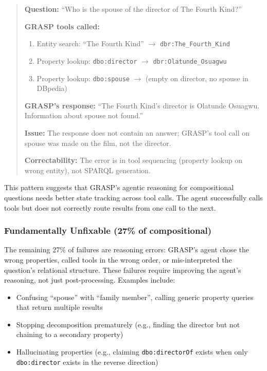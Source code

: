 \begin{quote}
\small
\textbf{Question:} ``Who is the spouse of the director of The Fourth Kind?''

\textbf{GRASP tools called:}
\begin{enumerate}
\item Entity search: ``The Fourth Kind'' $\to$ \texttt{dbr:The\_Fourth\_Kind}
\item Property lookup: \texttt{dbo:director} $\to$ \texttt{dbr:Olatunde\_Osuagwu}
\item Property lookup: \texttt{dbo:spouse} $\to$ (empty on director, no spouse in DBpedia)
\end{enumerate}

\textbf{GRASP's response:} ``The Fourth Kind's director is Olatunde Osuagwu. Information about spouse not found.''

\textbf{Issue:} The response does not contain an answer; GRASP's tool call on spouse was made on the film, not the director.

\textbf{Correctability:} The error is in tool sequencing (property lookup on wrong entity), not SPARQL generation.
\end{quote}

This pattern suggests that GRASP's agentic reasoning for compositional questions needs better state tracking across tool calls. The agent successfully calls tools but does not correctly route results from one call to the next.

\subsubsection{Fundamentally Unfixable (27\% of compositional)}

The remaining 27\% of failures are reasoning errors: GRASP's agent chose the wrong properties, called tools in the wrong order, or mis-interpreted the question's relational structure. These failures require improving the agent's reasoning, not just post-processing. Examples include:

\begin{itemize}
\item Confusing ``spouse'' with ``family member'', calling generic property queries that return multiple results
\item Stopping decomposition prematurely (e.g., finding the director but not chaining to a secondary property)
\item Hallucinating properties (e.g., claiming \texttt{dbo:directorOf} exists when only \texttt{dbo:director} exists in the reverse direction)
\end{itemize}

